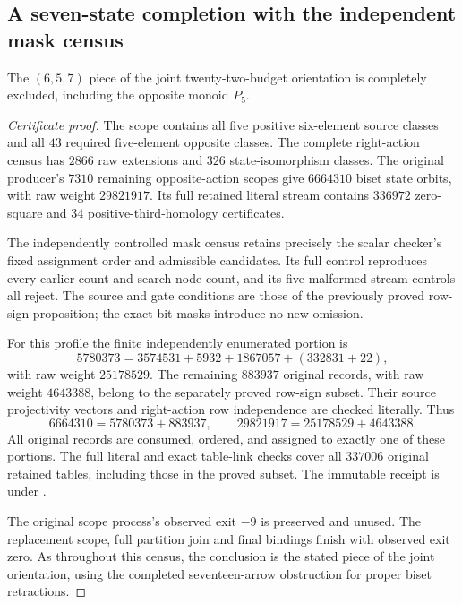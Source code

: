 \subsection{A seven-state completion with the independent mask census}

\begin{proposition}
\label{CP2:A-oriented-eighteen-six-five-seven}
The $(6,5,7)$ piece of the joint twenty-two-budget orientation is
completely excluded, including the opposite monoid $P_5$.
\end{proposition}
\begin{proof}[Certificate proof]
The scope contains all five positive six-element source classes and
all $43$ required five-element opposite classes.  The complete
right-action census has $2866$ raw extensions and $326$
state-isomorphism classes.  The original producer's $7310$ remaining
opposite-action scopes give $6664310$ biset state orbits, with raw weight
$29821917$.  Its full retained literal stream contains $336972$
zero-square and $34$ positive-third-homology certificates.

The independently controlled mask census retains precisely the scalar
checker's fixed assignment order and admissible candidates.  Its full
control reproduces every earlier count and search-node count, and its
five malformed-stream controls all reject.  The source and gate
conditions are those of the previously proved row-sign proposition;
the exact bit masks introduce no new omission.

For this profile the finite independently enumerated portion is
\[
 5780373=3574531+5932+1867057+(332831+22),
\]
with raw weight $25178529$.  The remaining $883937$ original records,
with raw weight $4643388$, belong to the separately proved row-sign
subset.  Their source projectivity vectors and right-action row
independence are checked literally.  Thus
\[
 6664310=5780373+883937,\qquad
 29821917=25178529+4643388.
\]
All original records are consumed, ordered, and assigned to exactly one
of these portions.  The full literal and exact table-link checks cover
all $337006$ original retained tables, including those in the proved
subset.  The immutable receipt is
 under
.

The original scope process's observed exit $-9$ is preserved and unused.
The replacement scope, full partition join and final bindings finish
with observed exit zero.  As throughout this census, the conclusion is
the stated piece of the joint orientation, using the completed
seventeen-arrow obstruction for proper biset retractions.
\end{proof}
